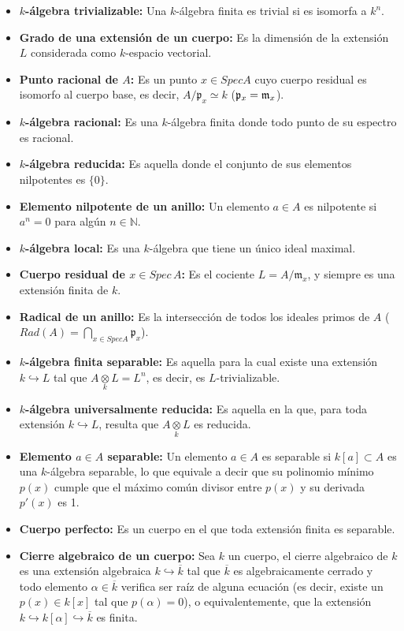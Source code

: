 \begin{itemize}
    \item \textbf{$k$-\'algebra trivializable:} Una $k$-álgebra finita es trivial si es isomorfa a $k^n$.
    \item \textbf{Grado de una extensi\'on de un cuerpo:}  Es la dimensión de la extensión $L$ considerada como $k$-espacio vectorial.
    \item \textbf{Punto racional de $A$:} Es un punto $x \in Spec A$ cuyo cuerpo residual es isomorfo al cuerpo base, es decir, $A/\mathfrak{p}_x \simeq k$ ($\mathfrak{p}_x=\mathfrak{m}_x$). 
    \item \textbf{$k$-\'algebra racional:} Es una $k$-álgebra finita donde todo punto de su espectro es racional. 
    \item \textbf{$k$-\'algebra reducida:} Es aquella donde el conjunto de sus elementos nilpotentes es $\{0\}$. 
    \item \textbf{Elemento nilpotente de un anillo:} Un elemento $a \in A$ es nilpotente si $a^n = 0$ para algún $n \in \mathbb{N}$. 
    \item \textbf{$k$-\'algebra local:} Es una $k$-álgebra que tiene un único ideal maximal.
    \item \textbf{Cuerpo residual de $x \in Spec \, A$:} Es el cociente $L = A/\mathfrak{m}_x$, y siempre es una extensión finita de $k$. 
    \item \textbf{Radical de un anillo:} Es la intersección de todos los ideales primos de $A$ ($Rad(A) = \bigcap_{x \in Spec A} \mathfrak{p}_x$).
    \item \textbf{$k$-\'algebra finita separable:}  Es aquella para la cual existe una extensión $k \hookrightarrow L$ tal que $A \underset{k}{\otimes} L = L^n$, es decir, es $L$-trivializable. 
    \item \textbf{$k$-\'algebra universalmente reducida:} Es aquella en la que, para toda extensión $k \hookrightarrow L$, resulta que $A \underset{k}{\otimes} L$ es reducida. 
    \item \textbf{Elemento $a \in A$ separable:} Un elemento $a \in A$ es separable si $k[a] \subset A$ es una $k$-álgebra separable, lo que equivale a decir que su polinomio mínimo $p(x)$ cumple que el máximo común divisor entre $p(x)$ y su derivada $p'(x)$ es 1.
    \item \textbf{Cuerpo perfecto:} Es un cuerpo en el que toda extensión finita es separable. 
    \item \textbf{Cierre algebraico de un cuerpo:} Sea $k$ un cuerpo, el cierre algebraico de $k$ es una extensión algebraica $k \hookrightarrow \overline{k}$ tal que $\overline{k}$ es algebraicamente cerrado y todo elemento $\alpha \in \overline{k}$ verifica ser raíz de alguna ecuación (es decir, existe un $p(x) \in k[x]$ tal que $p(\alpha) = 0$), o equivalentemente, que la extensión $k \hookrightarrow k[\alpha] \hookrightarrow \overline{k}$ es finita. 
\end{itemize}
